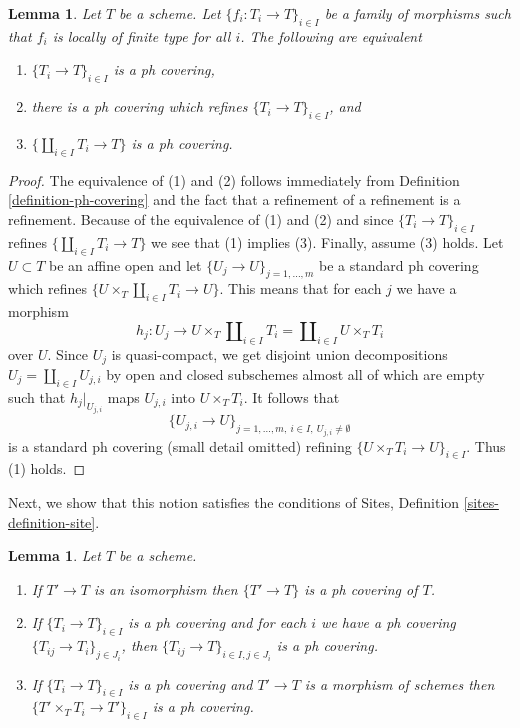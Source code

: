 \documentclass{stacks-project}
\theoremstyle{plain}
\newtheorem{lemma}[subsection]{Lemma}
\theoremstyle{definition}
\theoremstyle{remark}
\numberwithin{equation}{subsection}
\begin{document}
\begin{lemma}
\label{lemma-refine-by-ph}
Let $T$ be a scheme. Let $\{f_i : T_i \to T\}_{i \in I}$ be a family
of morphisms such that $f_i$ is locally of finite type for all $i$.
The following are equivalent
\begin{enumerate}
\item $\{T_i \to T\}_{i \in I}$ is a ph covering,
\item there is a ph covering which refines $\{T_i \to T\}_{i \in I}$, and
\item $\{\coprod_{i \in I} T_i \to T\}$ is a ph covering.
\end{enumerate}
\end{lemma}

\begin{proof}
The equivalence of (1) and (2) follows immediately from
Definition \ref{definition-ph-covering}
and the fact that a refinement of a refinement is a refinement.
Because of the equivalence of (1) and (2) and since
$\{T_i \to T\}_{i \in I}$ refines $\{\coprod_{i \in I} T_i \to T\}$
we see that (1) implies (3). Finally, assume (3) holds.
Let $U \subset T$ be an affine open and let
$\{U_j \to U\}_{j = 1, \ldots, m}$ be a standard ph covering
which refines $\{U \times_T \coprod_{i \in I} T_i \to U\}$.
This means that for each $j$ we have a morphism
$$
h_j :
U_j
\longrightarrow
U \times_T \coprod\nolimits_{i \in I} T_i =
\coprod\nolimits_{i \in I} U \times_T T_i
$$
over $U$. Since $U_j$ is quasi-compact, we get
disjoint union decompositions $U_j = \coprod_{i \in I} U_{j, i}$
by open and closed subschemes almost all of which are empty
such that $h_j|_{U_{j, i}}$ maps $U_{j, i}$ into $U \times_T T_i$.
It follows that
$$
\{U_{j, i} \to U\}_{j = 1, \ldots, m,\ i \in I,\ U_{j, i} \not = \emptyset}
$$
is a standard ph covering (small detail omitted) refining
$\{U \times_T T_i \to U\}_{i \in I}$. Thus (1) holds.
\end{proof}

\noindent
Next, we show that this notion satisfies the conditions of
Sites, Definition \ref{sites-definition-site}.

\begin{lemma}
\label{lemma-ph}
Let $T$ be a scheme.
\begin{enumerate}
\item If $T' \to T$ is an isomorphism then $\{T' \to T\}$
is a ph covering of $T$.
\item If $\{T_i \to T\}_{i\in I}$ is a ph covering and for each
$i$ we have a ph covering $\{T_{ij} \to T_i\}_{j\in J_i}$, then
$\{T_{ij} \to T\}_{i \in I, j\in J_i}$ is a ph covering.
\item If $\{T_i \to T\}_{i\in I}$ is a ph covering
and $T' \to T$ is a morphism of schemes then
$\{T' \times_T T_i \to T'\}_{i\in I}$ is a ph covering.
\end{enumerate}
\end{lemma}
\end{document}
